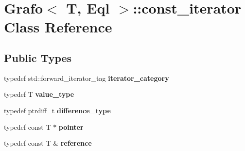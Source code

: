 \hypertarget{classGrafo_1_1const__iterator}{}\section{Grafo$<$ T, Eql $>$\+:\+:const\+\_\+iterator Class Reference}
\label{classGrafo_1_1const__iterator}
\subsection*{Public Types}
\begin{DoxyCompactItemize}
\item 
\mbox{\label{classGrafo_1_1const__iterator_aa7b8fe4503f44356fd3e6cbf7710aedf}} 
typedef std\+::forward\+\_\+iterator\+\_\+tag {\bfseries iterator\+\_\+category}
\item 
\mbox{\label{classGrafo_1_1const__iterator_a2b593ef038ec8bded08db90d36efb42c}} 
typedef T {\bfseries value\+\_\+type}
\item 
\mbox{\label{classGrafo_1_1const__iterator_a206c41d5ef4ac4437ff66b114e1145fe}} 
typedef ptrdiff\+\_\+t {\bfseries difference\+\_\+type}
\item 
\mbox{\label{classGrafo_1_1const__iterator_a513ddafff4db3bd12f10f903e0e72bde}} 
typedef const T $\ast$ {\bfseries pointer}
\item 
\mbox{\label{classGrafo_1_1const__iterator_a9871e88a80fe879397decb1eea8a13a8}} 
typedef const T \& {\bfseries reference}
\end{DoxyCompactItemize}
